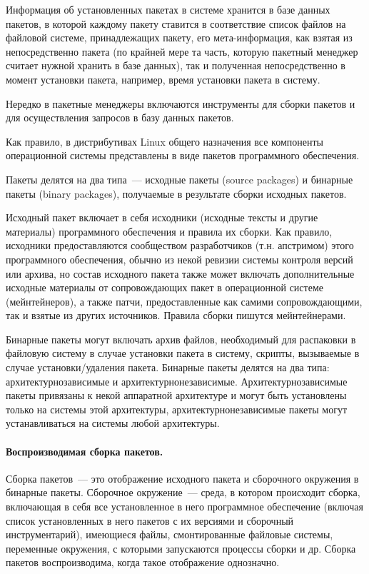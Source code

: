 \documentclass[10pt, a5paper]{article}
\begin{document}
Информация об установленных пакетах в системе хранится в базе данных пакетов, в которой каждому пакету ставится в соответствие список файлов на файловой системе, принадлежащих пакету, его мета-информация, как взятая из непосредственно пакета (по крайней мере та часть, которую пакетный менеджер считает нужной хранить в базе данных), так и полученная непосредственно в момент установки пакета, например, время установки пакета в систему.

Нередко в пакетные менеджеры включаются инструменты для сборки пакетов и для осуществления запросов в базу данных пакетов.

Как правило, в дистрибутивах Linux общего назначения все компоненты операционной системы представлены в виде пакетов программного обеспечения.

Пакеты делятся на два типа~--- исходные пакеты (source packages) и бинарные пакеты (binary packages), получаемые в результате сборки исходных пакетов.

Исходный пакет включает в себя исходники (исходные тексты и другие материалы) программного обеспечения и правила их сборки. Как правило, исходники предоставляются сообществом разработчиков (т.н. апстримом) этого программного обеспечения, обычно из некой ревизии системы контроля версий или архива, но состав исходного пакета также может включать дополнительные исходные материалы от сопровождающих пакет в операционной системе (мейнтейнеров), а также патчи, предоставленные как самими сопровождающими, так и взятые из других источников. Правила сборки пишутся мейнтейнерами.

Бинарные пакеты могут включать архив файлов, необходимый для распаковки в файловую систему в случае установки пакета в систему, скрипты, вызываемые в случае установки/удаления пакета. Бинарные пакеты делятся на два типа: архитектурнозависимые и архитектурнонезависимые. Архитектурнозависимые пакеты привязаны к некой аппаратной архитектуре и могут быть установлены только на системы этой архитектуры, архитектурнонезависимые пакеты могут устанавливаться на системы любой архитектуры.

\paragraph{Воспроизводимая сборка пакетов.}

Сборка пакетов~--- это отображение исходного пакета и сборочного окружения в бинарные пакеты.
Сборочное окружение~--- среда, в котором происходит сборка, включающая в себя все установленное в него программное обеспечение (включая список установленных в него пакетов с их версиями и сборочный инструментарий), имеющиеся файлы, смонтированные файловые системы, переменные окружения, с которыми запускаются процессы сборки и др.
Сборка пакетов воспроизводима, когда такое отображение однозначно.
\end{document}
